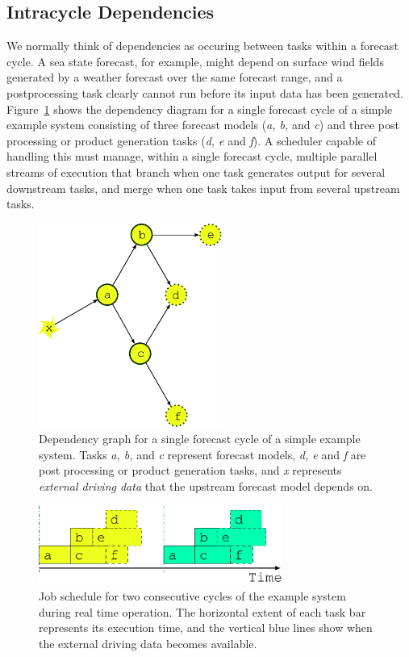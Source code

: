 \documentclass[11pt,a4paper]{article}
\begin{document}
\subsection{Intracycle Dependencies} 
\label{IntracycleDependencies}

We normally think of dependencies as occuring between tasks within a
forecast cycle. A sea state forecast, for example, might depend on
surface wind fields generated by a weather forecast over the same
forecast range, and a postprocessing task clearly cannot run before its
input data has been generated. Figure~\ref{fig-dep-one} shows the
dependency diagram for a single forecast cycle of a simple example
system consisting of three forecast models ({\em a, b,} and {\em c}) and
three post processing or product generation tasks ({\em d, e} and {\em
f}).  A scheduler capable of handling this must manage, within a single
forecast cycle, multiple parallel streams of execution that branch when
one task generates output for several downstream tasks, and merge when
one task takes input from several upstream tasks. 

\begin{figure} \label{fig-dep-one} 
    \begin{center}
        \includegraphics[width=6cm]{inkscape-svg/dep-one-cycle} 
    \end{center}
    \caption{\small Dependency graph for a single forecast cycle of a
    simple example system. Tasks {\em a, b,} and {\em c} represent
    forecast models, {\em d, e} and {\em f} are post processing or
    product generation tasks, and {\em x} represents {\em external
    driving data} that the upstream forecast model depends on.}
\end{figure} 

\begin{figure} \label{fig-time-one}
    \begin{center}
        \includegraphics[width=8cm]{inkscape-svg/timeline-one}
    \end{center}
    \caption{\small Job schedule for two consecutive cycles of
the example system during real time operation. The horizontal extent of
each task bar represents its execution time, and the vertical blue lines
show when the external driving data becomes available.}
\end{figure}
\end{document}
